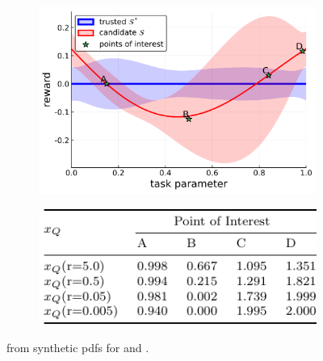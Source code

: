\begin{figure}[tbp]
    \centering
    \begin{subfigure}[c]{0.5\linewidth}
        \centering
        \includegraphics[width=0.99\linewidth]{Figures/p1.png}
        \vfill
    \end{subfigure}%
    \hfill
    \begin{subfigure}[t]{0.5\linewidth}
        \centering
        \includegraphics[width=0.95\linewidth]{Figures/p1_table.pdf}
    \end{subfigure}
    \caption{\xQ{} from synthetic \pri{} pdfs for \solvetrust{} and \solvecand{}.}
    \label{fig:sq_thry1}
\end{figure}

